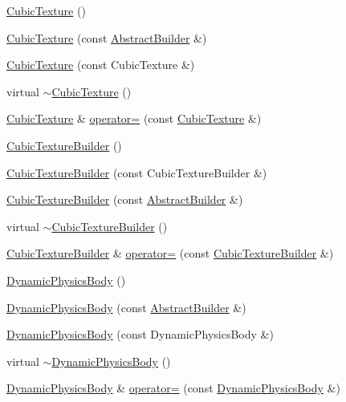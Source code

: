 \begin{DoxyCompactItemize}
\item 
\hyperlink{namespacejli_a1d29d42a67cba1e824b2bbef37ad3ac7}{Cubic\+Texture} ()
\item 
\hyperlink{namespacejli_afcdf119bfd2e7541a5d202805d6f07ad}{Cubic\+Texture} (const \hyperlink{classjli_1_1_abstract_builder}{Abstract\+Builder} \&)
\item 
\hyperlink{namespacejli_a224b5438fe535ded0127d92bd9e595dc}{Cubic\+Texture} (const Cubic\+Texture \&)
\item 
virtual \hyperlink{namespacejli_a64fcdd5d3fead8d1be7f29da5ee2d330}{$\sim$\+Cubic\+Texture} ()
\item 
\hyperlink{namespacejli_a1d29d42a67cba1e824b2bbef37ad3ac7}{Cubic\+Texture} \& \hyperlink{namespacejli_ad7545b9768425cea8f01be5265c970c8}{operator=} (const \hyperlink{namespacejli_a1d29d42a67cba1e824b2bbef37ad3ac7}{Cubic\+Texture} \&)
\item 
\hyperlink{namespacejli_a2a86125c6b724a9338c6950c2d88ba63}{Cubic\+Texture\+Builder} ()
\item 
\hyperlink{namespacejli_a5f17b78a514c78975beb02040161f8f7}{Cubic\+Texture\+Builder} (const Cubic\+Texture\+Builder \&)
\item 
\hyperlink{namespacejli_a2640ff46287ef90c9cbe4d81d3e87c46}{Cubic\+Texture\+Builder} (const \hyperlink{classjli_1_1_abstract_builder}{Abstract\+Builder} \&)
\item 
virtual \hyperlink{namespacejli_aa2eeb6eccc9f5dd78d8a050d1c00eafc}{$\sim$\+Cubic\+Texture\+Builder} ()
\item 
\hyperlink{namespacejli_a2a86125c6b724a9338c6950c2d88ba63}{Cubic\+Texture\+Builder} \& \hyperlink{namespacejli_a23318afe35b09c9c6d4fb466724ad63a}{operator=} (const \hyperlink{namespacejli_a2a86125c6b724a9338c6950c2d88ba63}{Cubic\+Texture\+Builder} \&)
\item 
\hyperlink{namespacejli_a3bc1a43f8a3bfe33e3874a74ebfde685}{Dynamic\+Physics\+Body} ()
\item 
\hyperlink{namespacejli_a624a3cdacc2bbdd8f5aa1bfa94d65e78}{Dynamic\+Physics\+Body} (const \hyperlink{classjli_1_1_abstract_builder}{Abstract\+Builder} \&)
\item 
\hyperlink{namespacejli_a3bdc7905c274142d7f2930b7632bb0bc}{Dynamic\+Physics\+Body} (const Dynamic\+Physics\+Body \&)
\item 
virtual \hyperlink{namespacejli_a69f8874be747ab0e2f52c063ff30cf8a}{$\sim$\+Dynamic\+Physics\+Body} ()
\item 
\hyperlink{namespacejli_a3bc1a43f8a3bfe33e3874a74ebfde685}{Dynamic\+Physics\+Body} \& \hyperlink{namespacejli_aebf62cef126edcd79bdabcfa87a74074}{operator=} (const \hyperlink{namespacejli_a3bc1a43f8a3bfe33e3874a74ebfde685}{Dynamic\+Physics\+Body} \&)

\end{DoxyCompactItemize}
